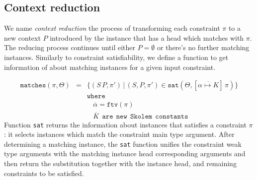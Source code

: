 \documentclass[a4paper, 11pt]{article}
\theoremstyle{definition}
\begin{document}
%
%

\subsection{Context reduction}

We name \emph{context reduction} the process of transforming
each constraint $\pi$ to a new context $P$ introduced
by the instance that has a head which matches with
$\pi$. The reducing process continues until either $P = \emptyset$
or there's no further matching instances. Similarly to
constraint satisfiability, we define a function to
get information of about matching instances for a given
input constraint.

\[
  \begin{array}{lcl}
    \mathtt{matches}(\pi,\Theta) & = &\{(S\,P,\pi')\,|\,(S,P,\pi') \in \mathtt{sat}(\Theta,[\overline{\alpha\mapsto K}]\,\pi)\}\\
                          &   &\mathtt{where} \\
                          &   &\:\:\:\:\overline{\alpha} = \mathtt{ftv}(\pi)\\
                          &   &\:\:\:\:\overline{K}\:\:\mathtt{are}\:\:\mathtt{new}\:\:\mathtt{Skolem}\:\:\mathtt{constants}
  \end{array}
\]
Function \texttt{sat} returns the information about instances that satisfies
a constraint $\pi$: it selects instances which match the constraint
main type argument. After determining a matching instance, the
\texttt{sat} function unifies the constraint weak type arguments with
the matching instance head corresponding arguments and then
return the substitution together with the instance head, and
remaining constraints to be satisfied.
\end{document}
